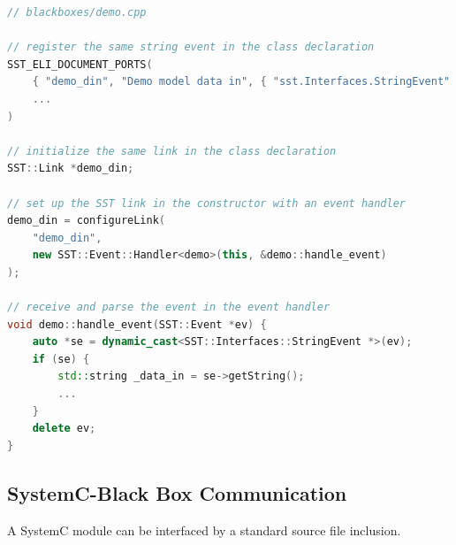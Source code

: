 \documentclass{article}
\begin{document}
\begin{lstlisting}[language=C++]
// blackboxes/demo.cpp

// register the same string event in the class declaration
SST_ELI_DOCUMENT_PORTS(
    { "demo_din", "Demo model data in", { "sst.Interfaces.StringEvent" }},
    ...
)

// initialize the same link in the class declaration
SST::Link *demo_din;

// set up the SST link in the constructor with an event handler
demo_din = configureLink(
    "demo_din",
    new SST::Event::Handler<demo>(this, &demo::handle_event)
);

// receive and parse the event in the event handler
void demo::handle_event(SST::Event *ev) {
    auto *se = dynamic_cast<SST::Interfaces::StringEvent *>(ev);
    if (se) {
        std::string _data_in = se->getString();
        ...
    }
    delete ev;
}
\end{lstlisting}

    \subsection{SystemC-Black Box Communication}
    A SystemC module can be interfaced by a standard source file inclusion.
\end{document}
